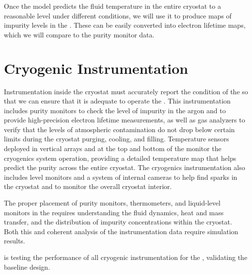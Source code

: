 Once the   model %
predicts the fluid temperature in the entire cryostat to a reasonable level under different conditions, we will use it %
to produce maps of impurity levels in the . These can be easily converted into electron lifetime maps, which we will %
compare to the %
 purity monitor data. 


\section{Cryogenic Instrumentation}
\label{sec:fdgen-cryo-instr}
Instrumentation inside the cryostat must accurately report the condition of the  so that we can ensure that it is adequate to operate the .
This instrumentation includes %
purity monitors %
to check the level of impurity in the argon and %
to provide high-precision electron lifetime measurements,
as well as gas analyzers to verify that the levels of atmospheric contamination do not drop below certain limits during the cryostat purging, cooling, and filling. 
Temperature sensors deployed in vertical arrays and at the top and bottom of the  monitor the cryogenics system operation, providing a 
detailed \threed temperature map that helps predict the \lar purity across the entire cryostat. The cryogenics instrumentation also includes \lar level monitors and
a system of internal cameras to help find sparks in the cryostat and %
to monitor the overall cryostat interior. 

The proper placement of purity monitors, thermometers, and liquid-level monitors in the  requires %
understanding the \lar fluid dynamics, heat and mass transfer, and the distribution of impurity concentrations within the cryostat. %
Both this and %
coherent analysis of the instrumentation data require  simulation results.

 is testing the performance of all cryogenic instrumentation for the , validating the baseline  %
design.

